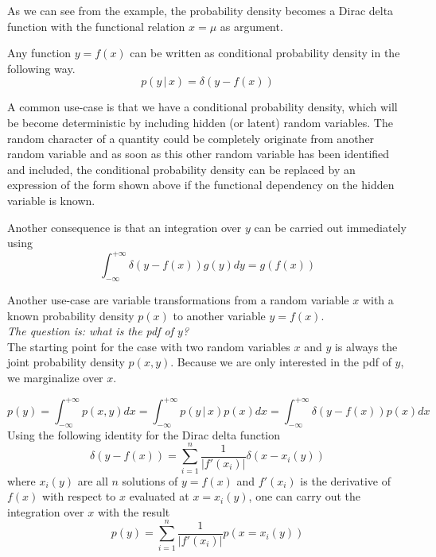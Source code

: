 \documentclass{tstextbook}
\begin{document}
As we can see from the example, the probability density becomes a Dirac delta function with the functional relation $x=\mu$ as argument.

\begin{definition}
  \label{th:deterministicprobabilitydensity}
  Any function $y=f(x)$ can be written as conditional probability density in the following way.
  \begin{equation}
    p(y\,\vert\,x)=\delta\left(y-f(x)\right)
  \end{equation} 
\end{definition}

A common use-case is that we have a conditional probability density, which will be become deterministic by including hidden (or latent) random variables. The random character of a quantity could be completely originate from another random variable and as soon as this other random variable has been identified and included, the conditional probability density can be replaced by an expression of the form shown above if the functional dependency on the hidden variable is known.

Another consequence is that an integration over $y$ can be carried out immediately using
  \begin{equation}
    \int_{-\infty}^{+\infty}\delta\left(y-f(x)\right)g(y)dy = g(f(x))
  \end{equation} 

Another use-case are variable transformations from a random variable $x$ with a known probability density $p(x)$ to another variable $y=f(x)$.\\

\textit{The question is: what is the pdf of $y$?}\\

The starting point for the case with two random variables $x$ and $y$ is always the joint probability density $p(x,y)$. Because we are only interested in the pdf of $y$, we marginalize over $x$.

  \begin{equation}
    p(y)=\int_{-\infty}^{+\infty}p(x,y)dx=
    \int_{-\infty}^{+\infty}p(y\,\vert\, x)p(x)dx=\int_{-\infty}^{+\infty}\delta\left(y-f(x)\right)p(x)dx
  \end{equation}
Using the following identity for the Dirac delta function
  \begin{equation}
   \delta\left(y-f(x)\right)=\sum_{i=1}^{n}\frac{1}{\vert f'(x_i)\vert}\delta(x-x_i(y))
  \end{equation}
where $x_i(y)$ are all $n$ solutions of $y=f(x)$ and $f'(x_i)$ is the derivative of $f(x)$ with respect to $x$ evaluated at $x=x_i(y)$, one can carry out the integration over $x$ with the result
  \begin{equation}
    p(y)=\sum_{i=1}^{n}\frac{1}{\vert f'(x_i)\vert}p\left(x=x_i(y)\right)
  \end{equation}
\end{document}
